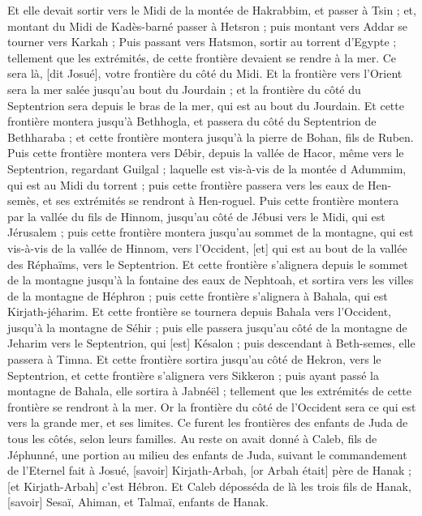 \begin{multicols}{2}
Et elle devait sortir vers le Midi de la montée de Hakrabbim, et passer à Tsin ; et, montant du Midi de Kadès-barné passer à Hetsron ; puis montant vers Addar se tourner vers Karkah ;
Puis passant vers Hatsmon, sortir au torrent d'Egypte ; tellement que les extrémités, de cette frontière devaient se rendre à la mer. Ce sera là, [dit Josué], votre frontière du côté du Midi.
Et la frontière vers l'Orient sera la mer salée jusqu'au bout du Jourdain ; et la frontière du côté du Septentrion sera depuis le bras de la mer, qui est au bout du Jourdain.
Et cette frontière montera jusqu'à Bethhogla, et passera du côté du Septentrion de Bethharaba ; et cette frontière montera jusqu'à la pierre de Bohan, fils de Ruben.
Puis cette frontière montera vers Débir, depuis la vallée de Hacor, même vers le Septentrion, regardant Guilgal ; laquelle est vis-à-vis de la montée d Adummim, qui est au Midi du torrent ; puis cette frontière passera vers les eaux de Hen-semès, et ses extrémités se rendront à Hen-roguel.
Puis cette frontière montera par la vallée du fils de Hinnom, jusqu'au côté de Jébusi vers le Midi, qui est Jérusalem ; puis cette frontière montera jusqu'au sommet de la montagne, qui est vis-à-vis de la vallée de Hinnom, vers l'Occident, [et] qui est au bout de la vallée des Réphaïms, vers le Septentrion.
Et cette frontière s'alignera depuis le sommet de la montagne jusqu'à la fontaine des eaux de Nephtoah, et sortira vers les villes de la montagne de Héphron ; puis cette frontière s'alignera à Bahala, qui est Kirjath-jéharim.
Et cette frontière se tournera depuis Bahala vers l'Occident, jusqu'à la montagne de Séhir ; puis elle passera jusqu'au côté de la montagne de Jeharim vers le Septentrion, qui [est] Késalon ; puis descendant à Beth-semes, elle passera à Timna.
Et cette frontière sortira jusqu'au côté de Hekron, vers le Septentrion, et cette frontière s'alignera vers Sikkeron ; puis ayant passé la montagne de Bahala, elle sortira à Jabnéël ; tellement que les extrémités de cette frontière se rendront à la mer.
Or la frontière du côté de l'Occident sera ce qui est vers la grande mer, et ses limites. Ce furent les frontières des enfants de Juda de tous les côtés, selon leurs familles.
Au reste on avait donné à Caleb, fils de Jéphunné, une portion au milieu des enfants de Juda, suivant le commandement de l'Eternel fait à Josué, [savoir] Kirjath-Arbah, [or Arbah était] père de Hanak ; [et Kirjath-Arbah] c'est Hébron.
Et Caleb déposséda de là les trois fils de Hanak, [savoir] Sesaï, Ahiman, et Talmaï, enfants de Hanak.

\end{multicols}
